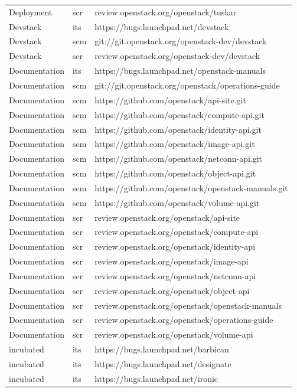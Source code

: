 \documentclass[a4wide,11pt]{report}
\begin{document}
\begin{center}
\begin{longtable}{|p{4cm}|p{1cm}|p{10cm}|}
Deployment&scr&review.openstack.org/openstack/tuskar\\ 
Devstack&its&https://bugs.launchpad.net/devstack\\ 
Devstack&scm&git://git.openstack.org/openstack-dev/devstack\\ 
Devstack&scr&review.openstack.org/openstack-dev/devstack\\ 
Documentation&its&https://bugs.launchpad.net/openstack-manuals\\ 
Documentation&scm&git://git.openstack.org/openstack/operations-guide\\ 
Documentation&scm&https://github.com/openstack/api-site.git\\ 
Documentation&scm&https://github.com/openstack/compute-api.git\\ 
Documentation&scm&https://github.com/openstack/identity-api.git\\ 
Documentation&scm&https://github.com/openstack/image-api.git\\ 
Documentation&scm&https://github.com/openstack/netconn-api.git\\ 
Documentation&scm&https://github.com/openstack/object-api.git\\ 
Documentation&scm&https://github.com/openstack/openstack-manuals.git\\ 
Documentation&scm&https://github.com/openstack/volume-api.git\\ 
Documentation&scr&review.openstack.org/openstack/api-site\\ 
Documentation&scr&review.openstack.org/openstack/compute-api\\ 
Documentation&scr&review.openstack.org/openstack/identity-api\\ 
Documentation&scr&review.openstack.org/openstack/image-api\\ 
Documentation&scr&review.openstack.org/openstack/netconn-api\\ 
Documentation&scr&review.openstack.org/openstack/object-api\\ 
Documentation&scr&review.openstack.org/openstack/openstack-manuals\\ 
Documentation&scr&review.openstack.org/openstack/operations-guide\\ 
Documentation&scr&review.openstack.org/openstack/volume-api\\ 
incubated&its&https://bugs.launchpad.net/barbican\\ 
incubated&its&https://bugs.launchpad.net/designate\\ 
incubated&its&https://bugs.launchpad.net/ironic\\ 

\end{longtable}
\end{center}
\end{document}
